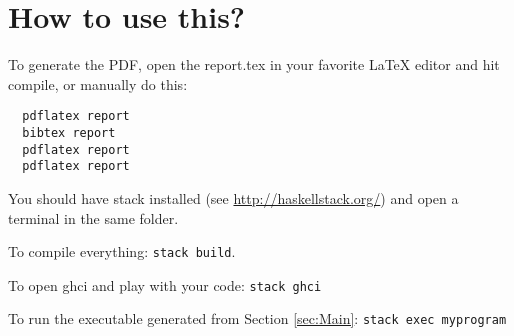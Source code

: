 
\section{How to use this?}

To generate the PDF, open the report.tex in your favorite LaTeX editor and
hit compile, or manually do this:

\begin{verbatim}
  pdflatex report
  bibtex report
  pdflatex report
  pdflatex report
\end{verbatim}

You should have stack installed (see \url{http://haskellstack.org/}) and
open a terminal in the same folder.

To compile everything: \texttt{stack build}.

To open ghci and play with your code: \texttt{stack ghci}

To run the executable generated from Section \ref{sec:Main}: \texttt{stack exec myprogram}
